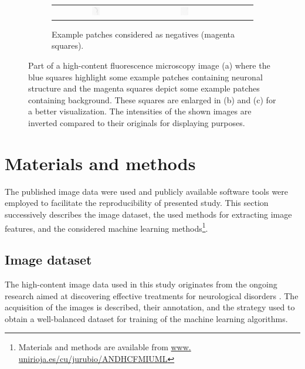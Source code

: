 \begin{figure}
\begin{subfigure}{\textwidth}
\begin{tabular}{c@{\,}c@{\,}c@{\,}c@{\,}c@{}}
			\includegraphics[width=0.1\textwidth]{fig01c14} &
			\includegraphics[width=0.1\textwidth]{fig01c15}
		\end{tabular}
		\vspace{-0.5em}
		\caption{Example patches considered as negatives (magenta squares).}
	\end{subfigure}	
	\caption{Part of a high-content fluorescence microscopy image (a) where the blue squares highlight some example patches containing neuronal structure and the magenta squares depict some example patches containing background. These squares are enlarged in (b) and (c) for a better visualization. The intensities of the shown images are inverted compared to their originals for displaying purposes.}
	\label{ch5_fig1}
\end{figure}
\section{Materials and methods}
\label{sec:matmet}
The published image data were used and publicly available software tools were employed to facilitate the reproducibility of presented study. This section successively describes the image dataset, the used methods for extracting image features, and the considered machine learning methods\footnote{Materials and methods are available from \url{www. unirioja.es/cu/jurubio/ANDHCFMIUML}}.

\subsection{Image dataset}
\label{sec:data}

The high-content image data used in this study originates from the ongoing research aimed at discovering effective treatments for neurological disorders \cite{cuesto2011phosphoinositide, enriquez2014learning, enriquez2016pi3k}. The acquisition of the images is described, their annotation, and the strategy used to obtain a well-balanced dataset for training of the machine learning algorithms.

